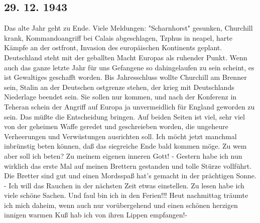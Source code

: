 \subsection{29. 12. 1943}

Das alte Jahr geht zu Ende.
Viele Meldungen: "Scharnhorst" gesunken, Churchill krank, Kommandoangriff bei Calais abgeschlagen, Tzphus in neapel, harte K\"{a}mpfe an der ostfront, Invasion des europ\"{a}ischen Kontinents geplant.
Deutschland steht mit der geballten Macht Europas als ruhender Punkt.
Wenn auch das ganze letzte Jahr f\"{u}r uns Gefangene so dahingelaufen zu sein scheint, es ist Gewaltiges geschafft worden.
Bis Jahresschluss wollte Churchill am Brenner sein, Stalin an der Deutschen ostgrenze stehen, der krieg mit Deutschlands Niederlage beendet sein.
Sie sollen nur kommen, und nach der Konferenz in Teheran schein der Angriff auf Europa ja unvermeidlich f\"{u}r England geworden zu sein.
Das m\"{u}{\ss}te die Entscheidung bringen.
Auf beiden Seiten ist viel, sehr viel von der geheimen Waffe geredet und geschreieben worden, die ungeheure Verheerungen und Verw\"{u}stungen ausrichten soll.
Ich m\"{o}cht jetzt manchmal inbr\"{u}nstig beten k\"{o}nnen, da{\ss} das siegreiche Ende bald kommen m\"{o}ge.
Zu wem aber soll ich beten?
Zu meinem eigenen inneren Gott!
- Gestern habe ich nun wirklich das erste Mal auf meinen Brettern gestanden und tolle St\"{u}rze vollf\"{u}hrt.
Die Bretter sind gut und einen Mordsspa{\ss} hat's gemacht in der pr\"{a}chtigen Sonne.
- Ich will das Rauchen in der n\"{a}chsten Zeit etwas einstellen.
Zu lesen habe ich viele sch\"{o}ne Sachen.
Und faul bin ich in den Ferien!!!
Heut nachmittag tr\"{a}umte ich mich daheim, wenn auch nur vor\"{u}bergehend und einen sch\"{o}nen herzigen innigen warmen Ku{\ss} hab ich von ihren Lippen empfangen!-

\clearpage
